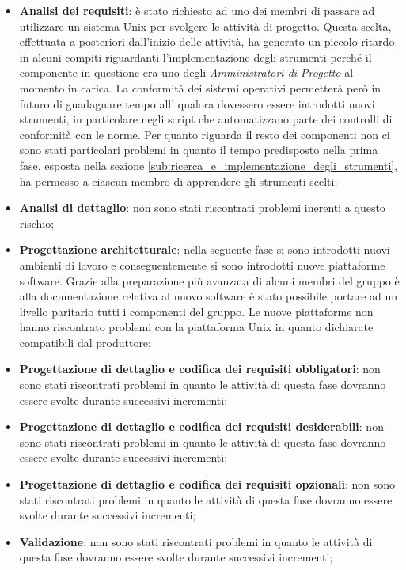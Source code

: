			\begin{itemize}
				\item \textbf{Analisi dei requisiti}: è stato richiesto ad uno dei membri di passare ad utilizzare un sistema Unix per svolgere le attività di progetto. Questa scelta, effettuata a posteriori dall'inizio delle attività, ha generato un piccolo ritardo in alcuni compiti riguardanti l'implementazione degli strumenti perché il componente in questione era uno degli \emph{Amministratori di Progetto} al momento in carica. \newline
				La conformità dei sistemi operativi permetterà però in futuro di guadagnare tempo all'\roleAdministrator{} qualora dovessero essere introdotti nuovi strumenti, in particolare negli script che automatizzano parte dei controlli di conformità con le norme. \newline
				Per quanto riguarda il resto dei componenti non ci sono stati particolari problemi in quanto il tempo predisposto nella prima fase, esposta nella sezione \ref{sub:ricerca_e_implementazione_degli_strumenti}, ha permesso a ciascun membro di apprendere gli strumenti scelti;
				\item \textbf{Analisi di dettaglio}: non sono stati riscontrati problemi inerenti a questo rischio;
				\item \textbf{Progettazione architetturale}: nella seguente fase si sono introdotti nuovi ambienti di lavoro e conseguentemente si sono introdotti nuove piattaforme software. Grazie alla preparazione più avanzata di alcuni membri del gruppo è alla documentazione relativa al nuovo software è stato possibile portare ad un livello paritario tutti i componenti del gruppo. Le nuove piattaforme non hanno riscontrato problemi con la piattaforma Unix in quanto dichiarate compatibili dal produttore;
				\item \textbf{Progettazione di dettaglio e codifica dei requisiti obbligatori}: non sono stati riscontrati problemi in quanto le attività di questa fase dovranno essere svolte durante successivi incrementi;
				\item \textbf{Progettazione di dettaglio e codifica dei requisiti desiderabili}: non sono stati riscontrati problemi in quanto le attività di questa fase dovranno essere svolte durante successivi incrementi;
				\item \textbf{Progettazione di dettaglio e codifica dei requisiti opzionali}: non sono stati riscontrati problemi in quanto le attività di questa fase dovranno essere svolte durante successivi incrementi;
				\item \textbf{Validazione}: non sono stati riscontrati problemi in quanto le attività di questa fase dovranno essere svolte durante successivi incrementi;
			\end{itemize}

